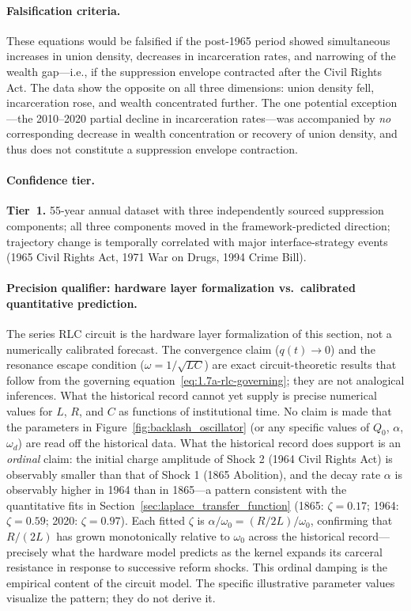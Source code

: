\paragraph{Falsification criteria.}
These equations would be falsified if the post-1965 period showed simultaneous increases in union density, decreases in incarceration rates, and narrowing of the wealth gap---i.e., if the suppression envelope contracted after the Civil Rights Act. The data show the opposite on all three dimensions: union density fell, incarceration rose, and wealth concentrated further. The one potential exception---the 2010--2020 partial decline in incarceration rates---was accompanied by \textit{no} corresponding decrease in wealth concentration or recovery of union density, and thus does not constitute a suppression envelope contraction.

\paragraph{Confidence tier.}
\textbf{Tier~1.} 55-year annual dataset with three independently sourced suppression components; all three components moved in the framework-predicted direction; trajectory change is temporally correlated with major interface-strategy events (1965 Civil Rights Act, 1971 War on Drugs, 1994 Crime Bill).

\paragraph{Precision qualifier: hardware layer formalization vs.\ calibrated quantitative prediction.}
The series RLC circuit is the hardware layer formalization of this section, not a numerically calibrated forecast. The convergence claim ($q(t) \rightarrow 0$) and the resonance escape condition ($\omega = 1/\sqrt{LC}$) are exact circuit-theoretic results that follow from the governing equation~\ref{eq:1.7a-rlc-governing}; they are not analogical inferences. What the historical record cannot yet supply is precise numerical values for $L$, $R$, and $C$ as functions of institutional time. No claim is made that the parameters in Figure~\ref{fig:backlash_oscillator} (or any specific values of $Q_0$, $\alpha$, $\omega_d$) are read off the historical data. What the historical record does support is an \textit{ordinal} claim: the initial charge amplitude of Shock 2 (1964 Civil Rights Act) is observably smaller than that of Shock 1 (1865 Abolition), and the decay rate $\alpha$ is observably higher in 1964 than in 1865---a pattern consistent with the quantitative fits in Section~\ref{sec:laplace_transfer_function} (1865: $\zeta = 0.17$; 1964: $\zeta = 0.59$; 2020: $\zeta = 0.97$). Each fitted $\zeta$ is $\alpha/\omega_0 = (R/2L)/\omega_0$, confirming that $R/(2L)$ has grown monotonically relative to $\omega_0$ across the historical record---precisely what the hardware model predicts as the kernel expands its carceral resistance in response to successive reform shocks. This ordinal damping is the empirical content of the circuit model. The specific illustrative parameter values visualize the pattern; they do not derive it.

